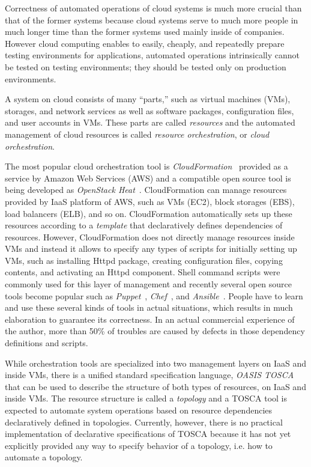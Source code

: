 \documentclass[12pt]{report}
\begin{document}
Correctness of automated operations of cloud systems is much more
crucial than that of the former systems because cloud systems serve to
much more people in much longer time than the former systems used
mainly inside of companies. However cloud computing enables to easily,
cheaply, and repeatedly prepare testing environments for applications,
automated operations intrinsically cannot be tested on testing
environments; they should be tested only on production environments.

A system on cloud consists of many ``parts,'' such as virtual machines
(VMs), storages, and network services as well as software packages,
configuration files, and user accounts in VMs. These parts are called
{\it resources} and the automated management of cloud resources is
called {\it resource orchestration}, or {\it cloud orchestration}.

The most popular cloud orchestration tool is {\it
  CloudFormation}~\cite{CloudFormation} provided as a service by
Amazon Web Services (AWS) and a compatible open source tool is being
developed as {\it OpenStack Heat}~\cite{Heat}. CloudFormation can
manage resources provided by IaaS platform of AWS, such as VMs (EC2),
block storages (EBS), load balancers (ELB), and so on. CloudFormation
automatically sets up these resources according to a {\it template}
that declaratively defines dependencies of resources. However,
CloudFormation does not directly manage resources inside VMs and
instead it allows to specify any types of scripts for initially
setting up VMs, such as installing Httpd package, creating
configuration files, copying contents, and activating an Httpd
component. Shell command scripts were commonly used for this layer of
management and recently several open source tools become popular such
as {\it Puppet}~\cite{Puppet}, {\it Chef}~\cite{Chef}, and {\it
  Ansible}~\cite{Ansible}. People have to learn and use these
several kinds of tools in actual situations, which results in much
elaboration to guarantee its correctness. In an actual commercial
experience of the author, more than 50\% of troubles are caused by
defects in those dependency definitions and scripts.

While orchestration tools are specialized into two management layers
on IaaS and inside VMs, there is a unified standard specification
language, {\it OASIS TOSCA}~\cite{TOSCA} that can be used to describe
the structure of both types of resources, on IaaS and inside VMs. The
resource structure is called a {\it topology} and a TOSCA tool is
expected to automate system operations based on resource dependencies
declaratively defined in topologies.  Currently, however, there is no
practical implementation of declarative specifications of TOSCA
because it has not yet explicitly provided any way to specify behavior
of a topology, i.e. how to automate a topology.
\end{document}
